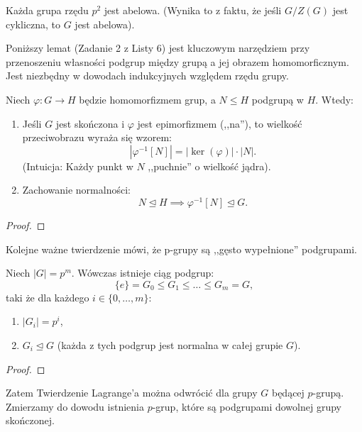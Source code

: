 \begin{corollary}
    Każda grupa rzędu $p^2$ jest abelowa. (Wynika to z faktu, że jeśli $G/Z(G)$ jest cykliczna, to $G$ jest abelowa).
\end{corollary}

Poniższy lemat (Zadanie 2 z Listy 6) jest kluczowym narzędziem przy przenoszeniu własności podgrup między grupą a jej obrazem homomorficznym. Jest niezbędny w dowodach indukcyjnych względem rzędu grupy.

\begin{lemma}[O przeciwobrazie]
    Niech $\varphi : G \to H$ będzie homomorfizmem grup, a $N \le H$ podgrupą w $H$. Wtedy:
    \begin{enumerate}[label=\arabic*.]
        \item Jeśli $G$ jest skończona i $\varphi$ jest epimorfizmem (,,na''), to wielkość przeciwobrazu wyraża się wzorem:
            \[ \left| \varphi ^{-1} [ N ] \right| = \left| \ker(\varphi ) \right| \cdot \left| N \right|. \]
            (Intuicja: Każdy punkt w $N$ ,,puchnie'' o wielkość jądra).
        \item Zachowanie normalności:
            \[ N \unlhd H \implies \varphi ^{-1}[ N ] \unlhd G. \]
    \end{enumerate}
\end{lemma}
\begin{proof}
\end{proof}

Kolejne ważne twierdzenie mówi, że p-grupy są ,,gęsto wypełnione'' podgrupami.

\begin{theorem}
    Niech $|G| = p^m$. Wówczas istnieje ciąg podgrup:
    \[
    \{e\} = G_0 \le G_1 \le \ldots \le G_m = G,
    \] 
    taki że dla każdego $i \in \{0, \ldots, m\}$:
    \begin{enumerate}
        \item $|G_i| = p^i$,
        \item $G_i \unlhd G$ (każda z tych podgrup jest normalna w całej grupie $G$).
    \end{enumerate}
\end{theorem} 
\begin{proof}
\end{proof} 

Zatem Twierdzenie Lagrange'a można odwrócić dla grupy $G$ będącej $p$-grupą. Zmierzamy do dowodu istnienia $p$-grup, które są podgrupami dowolnej grupy skończonej.
